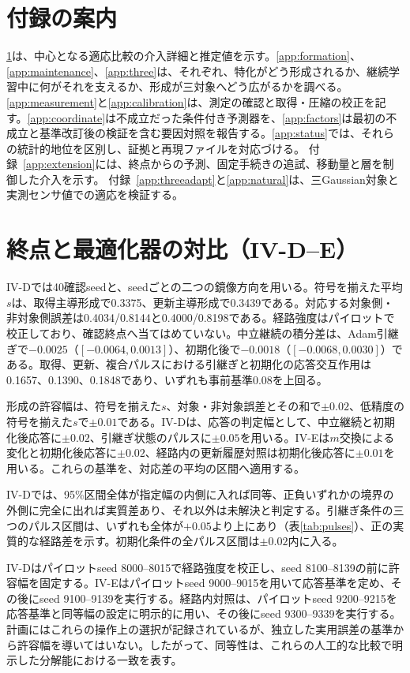 \section*{付録の案内}
\ref{app:optimizer}は、中心となる適応比較の介入詳細と推定値を示す。\ref{app:formation}、\ref{app:maintenance}、\ref{app:three}は、それぞれ、特化がどう形成されるか、継続学習中に何がそれを支えるか、形成が三対象へどう広がるかを調べる。\ref{app:measurement}と\ref{app:calibration}は、測定の確認と取得・圧縮の校正を記す。\ref{app:coordinate}は不成立だった条件付き予測器を、\ref{app:factors}は最初の不成立と基準改訂後の検証を含む要因対照を報告する。\ref{app:status}では、それらの統計的地位を区別し、証拠と再現ファイルを対応づける。 付録~\ref{app:extension}には、終点からの予測、固定手続きの追試、移動量と層を制御した介入を示す。 付録~\ref{app:threeadapt}と\ref{app:natural}は、三Gaussian対象と実測センサ値での適応を検証する。

\section{終点と最適化器の対比（IV-D--E）}
\label{app:optimizer}
IV-Dでは40確認seedと、seedごとの二つの鏡像方向を用いる。符号を揃えた平均$s$は、取得主導形成で0.3375、更新主導形成で0.3439である。対応する対象側・非対象側誤差は0.4034/0.8144と0.4000/0.8198である。経路強度はパイロットで校正しており、確認終点へ当てはめていない。中立継続の積分差は、Adam引継ぎで$-0.0025$（$[-0.0064,0.0013]$）、初期化後で$-0.0018$（$[-0.0068,0.0030]$）である。取得、更新、複合パルスにおける引継ぎと初期化の応答交互作用は0.1657、0.1390、0.1848であり、いずれも事前基準0.08を上回る。

形成の許容幅は、符号を揃えた$s$、対象・非対象誤差とその和で$\pm0.02$、低精度の符号を揃えた$s$で$\pm0.01$である。IV-Dは、応答の判定幅として、中立継続と初期化後応答に$\pm0.02$、引継ぎ状態のパルスに$\pm0.05$を用いる。IV-Eは$m$交換による変化と初期化後応答に$\pm0.02$、経路内の更新履歴対照は初期化後応答に$\pm0.01$を用いる。これらの基準を、対応差の平均の区間へ適用する。

IV-Dでは、95\%区間全体が指定幅の内側に入れば同等、正負いずれかの境界の外側に完全に出れば実質差あり、それ以外は未解決と判定する。引継ぎ条件の三つのパルス区間は、いずれも全体が$+0.05$より上にあり（表\ref{tab:pulses}）、正の実質的な経路差を示す。初期化条件の全パルス区間は$\pm0.02$内に入る。

IV-Dはパイロットseed 8000--8015で経路強度を校正し、seed 8100--8139の前に許容幅を固定する。IV-Eはパイロットseed 9000--9015を用いて応答基準を定め、その後にseed 9100--9139を実行する。経路内対照は、パイロットseed 9200--9215を応答基準と同等幅の設定に明示的に用い、その後にseed 9300--9339を実行する。計画にはこれらの操作上の選択が記録されているが、独立した実用誤差の基準から許容幅を導いてはいない。したがって、同等性は、これらの人工的な比較で明示した分解能における一致を表す。

